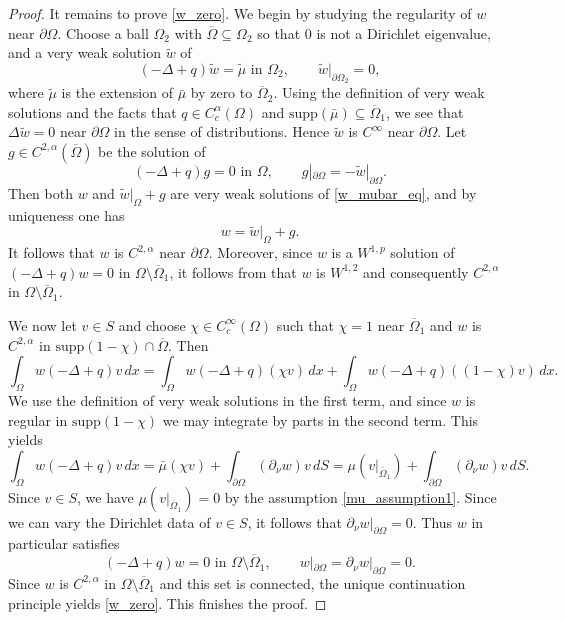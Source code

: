 \documentclass[11pt,a4paper]{amsart}
\theoremstyle{definition}
\numberwithin{equation}{section}
\newcommand{\ol}[1]{\overline{#1}}
\newcommand{\p}{\partial}
\newcommand{\Om}{\Omega}
\begin{document}
\begin{proof}
It remains to prove \eqref{w_zero}. We begin by studying the regularity of $w$ near $\p \Om$. Choose a ball $\Om_2$ with $\ol{\Om} \subseteq \Om_2$ so that $0$ is not a Dirichlet eigenvalue, and a very weak solution $\tilde{w}$ of 
\[
(-\Delta+q)\tilde{w} = \tilde{\mu} \text{ in $\Om_2$}, \qquad \tilde{w}|_{\p \Om_2} = 0,
\]
where $\tilde{\mu}$ is the extension of $\bar{\mu}$ by zero to $\ol{\Om}_2$.
Using the definition of very weak solutions and the facts that $q \in C^{\alpha}_c(\Om)$ and $\mathrm{supp}(\bar{\mu}) \subseteq \ol{\Om}_1$, we see that $\Delta \tilde{w} = 0$ near $\p \Om$ in the sense of distributions. Hence $\tilde{w}$ is $C^{\infty}$ near $\p \Om$. Let $g \in C^{2,\alpha}(\ol{\Om})$ be the solution of 
\[
(-\Delta+q)g = 0 \text{ in $\Om$}, \qquad g|_{\p \Om} = -\tilde{w}|_{\p \Om}.
\]
Then both $w$ and $\tilde{w}|_{\Omega} + g$ are very weak solutions of \eqref{w_mubar_eq}, and by uniqueness one has 
\[
w = \tilde{w}|_{\Omega} + g.
\]
It follows that $w$ is $C^{2,\alpha}$ near $\p \Om$. Moreover, since $w$ is a $W^{1,p}$ solution of $(-\Delta+q)w=0$ in $\Om \setminus \ol{\Om}_1$, it follows from \cite[see section 4. Concluding remarks]{hr} that $w$ is $W^{1,2}$ and consequently $C^{2,\alpha}$ in $\Om \setminus \ol{\Om}_1$.

We now let $v \in S$ and choose $\chi \in C^{\infty}_c(\Om)$ such that $\chi=1$ near $\ol{\Om}_1$ and $w$ is $C^{2,\alpha}$ in $\mathrm{supp}(1-\chi) \cap \ol{\Om}$. Then 
\[
\int_{\Om} w(-\Delta+q)v \,dx = \int_{\Om} w(-\Delta+q)(\chi v) \,dx + \int_{\Om} w(-\Delta+q)((1-\chi) v) \,dx.
\]
We use the definition of very weak solutions in the first term, and since $w$ is regular in $\mathrm{supp}(1-\chi)$ we may integrate by parts in the second term. This yields 
\[
\int_{\Om} w(-\Delta+q)v \,dx = \bar{\mu}(\chi v) + \int_{\p \Om} (\p_{\nu} w) v \,dS = \mu(v|_{\ol{\Om}_1}) + \int_{\p \Om} (\p_{\nu} w) v \,dS.
\]
Since $v \in S$, we have $\mu(v|_{\ol{\Om}_1}) = 0$ by the assumption \eqref{mu_assumption1}. Since we can vary the Dirichlet data of $v \in S$, it follows that $\p_{\nu} w|_{\p \Om} = 0$. Thus $w$ in particular satisfies 
\[
(-\Delta+q)w = 0 \text{ in $\Om \setminus \ol{\Om}_1$}, \qquad w|_{\p \Om} = \p_{\nu} w|_{\p \Om} = 0.
\]
Since $w$ is $C^{2,\alpha}$ in $\Om \setminus \ol{\Om}_1$ and this set is connected, the unique continuation principle yields \eqref{w_zero}. This finishes the proof.
\end{proof}



\printbibliography
\end{document}
